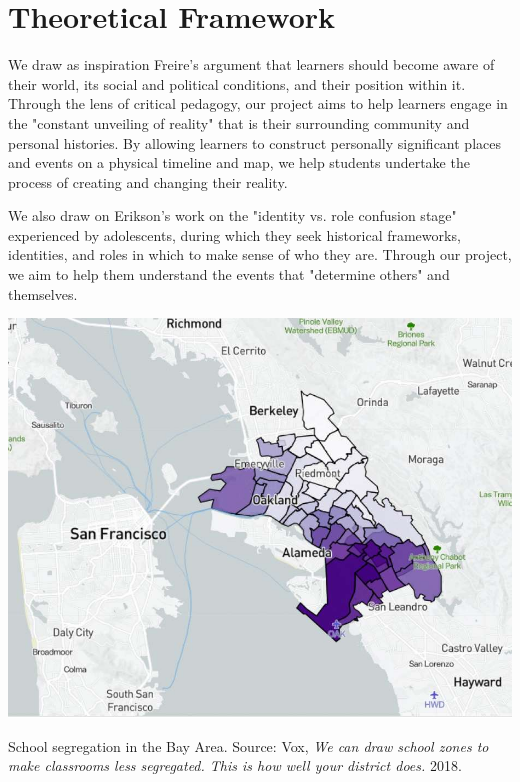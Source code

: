 \documentclass{sigchi-ext}
\begin{document}
\section{Theoretical Framework}
We draw as inspiration Freire's argument that learners should become aware of their world, its social and political conditions, and their position within it. Through the lens of critical pedagogy, our project aims to help learners engage in the "constant unveiling of reality" that is their surrounding community and personal histories. By allowing learners to construct personally significant places and events on a physical timeline and map, we help students undertake the process of creating and changing their reality.

We also draw on Erikson's work on the "identity vs. role confusion stage" experienced by adolescents, during which they seek historical frameworks, identities, and roles in which to make sense of who they are. Through our project, we aim to help them understand the events that "determine others" and themselves.

\begin{marginfigure}[-25pc]
  \begin{minipage}{\marginparwidth}
    \centering
    \includegraphics[width=0.9\marginparwidth]{figures/map}
    \caption{School segregation in the Bay Area. Source: Vox, \textit{We can draw school zones to make classrooms less segregated. This is how well your district does.} 2018.}~\label{fig:bay-area-map}
  \end{minipage}
\end{marginfigure}
\end{document}
